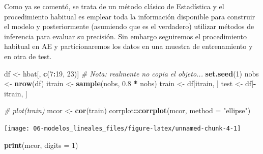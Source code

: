 \documentclass[
  spanish,
]{book}
\newenvironment{Shaded}{\begin{snugshade}}{\end{snugshade}}
\newcommand{\CommentTok}[1]{\textcolor[rgb]{0.56,0.35,0.01}{\textit{#1}}}
\newcommand{\DataTypeTok}[1]{\textcolor[rgb]{0.13,0.29,0.53}{#1}}
\newcommand{\DecValTok}[1]{\textcolor[rgb]{0.00,0.00,0.81}{#1}}
\newcommand{\FloatTok}[1]{\textcolor[rgb]{0.00,0.00,0.81}{#1}}
\newcommand{\KeywordTok}[1]{\textcolor[rgb]{0.13,0.29,0.53}{\textbf{#1}}}
\newcommand{\NormalTok}[1]{#1}
\newcommand{\OperatorTok}[1]{\textcolor[rgb]{0.81,0.36,0.00}{\textbf{#1}}}
\newcommand{\StringTok}[1]{\textcolor[rgb]{0.31,0.60,0.02}{#1}}
\theoremstyle{break}
\theoremstyle{definition}
\theoremstyle{definition}
\theoremstyle{definition}
\theoremstyle{remark}
\begin{document}
Como ya se comentó, se trata de un método clásico de Estadística y el procedimiento habitual es emplear toda la información disponible para construir el modelo y posteriormente (asumiendo que es el verdadero) utilizar métodos de inferencia para evaluar su precisión.
Sin embargo seguiremos el procedimiento habitual en AE y particionaremos los datos en una muestra de entrenamiento y en otra de test.

\begin{Shaded}
\begin{Highlighting}[]
\NormalTok{df <-}\StringTok{ }\NormalTok{hbat[, }\KeywordTok{c}\NormalTok{(}\DecValTok{7}\OperatorTok{:}\DecValTok{19}\NormalTok{, }\DecValTok{23}\NormalTok{)]  }\CommentTok{# Nota: realmente no copia el objeto...}
\KeywordTok{set.seed}\NormalTok{(}\DecValTok{1}\NormalTok{)}
\NormalTok{nobs <-}\StringTok{ }\KeywordTok{nrow}\NormalTok{(df)}
\NormalTok{itrain <-}\StringTok{ }\KeywordTok{sample}\NormalTok{(nobs, }\FloatTok{0.8} \OperatorTok{*}\StringTok{ }\NormalTok{nobs)}
\NormalTok{train <-}\StringTok{ }\NormalTok{df[itrain, ]}
\NormalTok{test <-}\StringTok{ }\NormalTok{df[}\OperatorTok{-}\NormalTok{itrain, ]}

\CommentTok{# plot(train)}
\NormalTok{mcor <-}\StringTok{ }\KeywordTok{cor}\NormalTok{(train)}
\NormalTok{corrplot}\OperatorTok{::}\KeywordTok{corrplot}\NormalTok{(mcor, }\DataTypeTok{method =} \StringTok{"ellipse"}\NormalTok{)}
\end{Highlighting}
\end{Shaded}

\begin{center}\texttt{[image: 06-modelos\_lineales\_files/figure-latex/unnamed-chunk-4-1]} \end{center}

\begin{Shaded}
\begin{Highlighting}[]
\KeywordTok{print}\NormalTok{(mcor, }\DataTypeTok{digits =} \DecValTok{1}\NormalTok{)}
\end{Highlighting}
\end{Shaded}
\end{document}
